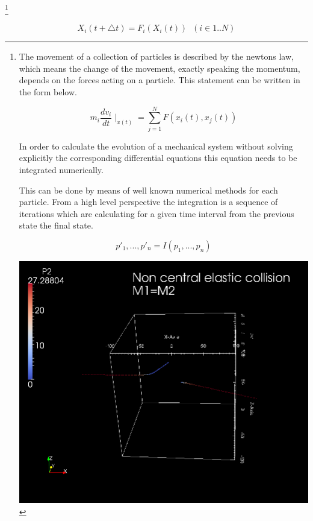 \documentclass[justified]{tufte-book}
\numberwithin{equation}{subsection}
\begin{document}
\footnote{ 
The movement of a collection of particles is described by the newtons law, which means
the change of the movement, exactly speaking the momentum, depends on the forces acting 
on a particle. This statement can be written in the form below.

\begin{equation}
m_{i}\frac{dv_{i}}{dt}\mid_{x(t)}=\sum_{j=1}^{N}F(x_{i}(t),x_{j}(t))
\end{equation}

In order to calculate the evolution of a mechanical system without solving explicitly 
the corresponding differential equations this equation needs to be integrated numerically.

This can be done by means of well known numerical methods for each particle. From a high
level perspective the integration is a sequence of iterations which are calculating for a given 
time interval from the previous state the final state.

\begin{equation}
p'_1,...,p'_n=I(p_1,...,p_n)
\end{equation}

\includegraphics{graphics/central3.png}

}

\begin{equation}
X_i(t+ \bigtriangleup t)=F_i(X_i(t)) \;\; (i \in 1..N)
 \label{eq:iteration}
\end{equation}
\end{document}
